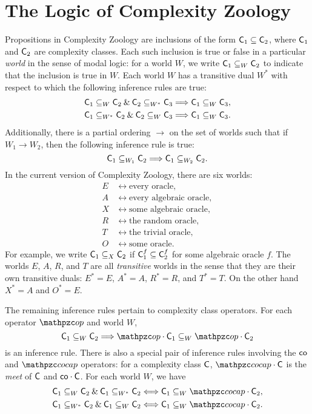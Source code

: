 \section{The Logic of Complexity Zoology}\label{zoology-logic}

Propositions in Complexity Zoology are inclusions of the form
$\mathsf{C}_1\subseteq\mathsf{C}_2$, where $\mathsf{C}_1$ and $\mathsf{C}_2$ are complexity classes. Each
such inclusion is true or false in a particular \textit{world} in the sense of
modal logic: for a world $W$, we write $\mathsf{C}_1\subseteq_W\mathsf{C}_2$ to indicate that
the inclusion is true in $W$. Each world $W$ has a transitive dual $W^*$ with
respect to which the following inference rules are true:
\begin{align*}
\mathsf{C}_1\subseteq_W\mathsf{C}_2\mathbin{\&}\mathsf{C}_2\subseteq_{W^*}\mathsf{C}_3
&\Longrightarrow\mathsf{C}_1\subseteq_W\mathsf{C}_3, \\
\mathsf{C}_1\subseteq_{W^*}\mathsf{C}_2\mathbin{\&}\mathsf{C}_2\subseteq_W\mathsf{C}_3
&\Longrightarrow\mathsf{C}_1\subseteq_W\mathsf{C}_3.
\end{align*}
Additionally, there is a partial ordering $\rightarrow$ on the set of worlds
such that if $W_1\rightarrow W_2$, then the following inference rule is true:
\[
\mathsf{C}_1\subseteq_{W_1}\mathsf{C}_2\Longrightarrow\mathsf{C}_1\subseteq_{W_2}\mathsf{C}_2.
\]
In the current version of Complexity Zoology, there are six worlds:
\begin{align*}
E &\longleftrightarrow\text{every oracle}, \\
A &\longleftrightarrow\text{every algebraic oracle}, \\
X &\longleftrightarrow\text{some algebraic oracle}, \\
R &\longleftrightarrow\text{the random oracle}, \\
T &\longleftrightarrow\text{the trivial oracle}, \\
O &\longleftrightarrow\text{some oracle}.
\end{align*}
For example, we write $\mathsf{C}_1\subseteq_X\mathsf{C}_2$ if $\mathsf{C}_1^f\subseteq\mathsf{C}_2^f$ for
some algebraic oracle $f$. The worlds $E$, $A$, $R$, and $T$ are all
\textit{transitive} worlds in the sense that they are their own transitive
duals: $E^*=E$, $A^*=A$, $R^*=R$, and $T^*=T$. On the other hand $X^*=A$ and
$O^*=E$.

The remaining inference rules pertain to complexity class operators. For each
operator $\op$ and world $W$,
\[
\sC_1\subseteq_W\sC_2\Longrightarrow\op\cdot\sC_1\subseteq_W\op\cdot\sC_2
\]
is an inference rule. There is also a special pair of inference rules involving
the $\mathsf{co}$ and $\cocap$ operators: for a complexity class $\mathsf{C}$, $\cocap\cdot\sC$
is the \textit{meet} of $\mathsf{C}$ and $\mathsf{co}\cdot\mathsf{C}$. For each world $W$, we have
\begin{align*}
\sC_1\subseteq_W\sC_2\AND\sC_1\subseteq_{W^*}\sC_2
&\Longleftrightarrow\sC_1\subseteq_W\cocap\cdot\sC_2, \\
\sC_1\subseteq_{W^*}\sC_2\AND\sC_1\subseteq_W\sC_2
&\Longleftrightarrow\sC_1\subseteq_W\cocap\cdot\sC_2.
\end{align*}

